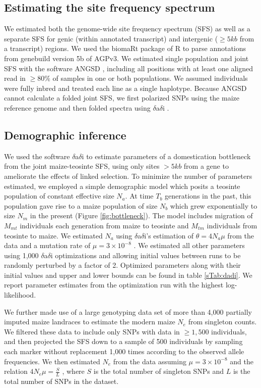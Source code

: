 \documentclass[12pt,a4paper]{article}
\begin{document}
\subsection*{Estimating the site frequency spectrum}
We estimated both the genome-wide site frequency spectrum (SFS) as well as a separate SFS for genic (within annotated transcript) and intergenic ($\geq 5kb$ from a transcript) regions. 
We used the biomaRt package \cite{durinck2009,durinck2005} of R \cite{R2014} to parse annotations from genebuild version 5b of AGPv3. 
We estimated single population and joint SFS with the software ANGSD \cite{korneliussen2014}, including all positions with at least one aligned read in $\geq 80\%$ of samples in one or both populations.
We assumed individuals were fully inbred and treated each line as a single haplotype. Because ANGSD cannot calculate a folded joint SFS, we first polarized SNPs using the maize reference genome and then folded spectra using $\delta$a$\delta$i \cite{gutenkunst2009}.

\subsection*{Demographic inference}
We used the software $\delta$a$\delta$i \cite{gutenkunst2009} to estimate parameters of a domestication bottleneck from the joint maize-teosinte SFS, using only sites $>5 kb$ from a gene to ameliorate the effects of linked selection.
To minimize the number of parameters estimated, we employed a simple demographic model which posits a teosinte population of constant effective size $N_a$.  At time $T_b$ generations in the past, this population gave rise to a maize population of size $N_b$ which grew exponentially to size $N_m$ in the present (Figure \ref{fig:bottleneck}).
The model includes migration of $M_{mt}$ individuals each generation from maize to teosinte and $M_{tm}$ individuals from teosinte to maize.  We estimated $N_a$ using $\delta$a$\delta$i's estimation of $\theta=4N_a\mu$ from the data and a mutation rate of $\mu = 3 \times 10^{-8}$ \cite{clark2005}. 
We estimated all other parameters using 1,000 $\delta$a$\delta$i optimizations and allowing initial values between runs to be randomly perturbed by a factor of 2.  
Optimized parameters along with their initial values and upper and lower bounds can be found in table \ref{sTab:dadi}. We report parameter estimates from the optimization run with the highest log-likelihood.

We further made use of a large genotyping data set of more than 4,000 partially imputed maize landraces \cite{Hearne2015} to estimate the modern maize $N_e$ from singleton counts. 
We filtered these data to include only SNPs with data in $\geq 1,500$ individuals, and then projected the SFS down to a sample of 500 individuals by sampling each marker without replacement 1,000 times according to the observed allele frequencies.
We then estimated $N_e$ from the data assuming $\mu = 3 \times 10^{-8}$ \cite{clark2005} and the relation  $4N_e\mu = \frac{S}{L}$ \cite{fu1993}, where $S$ is the total number of singleton SNPs and $L$ is the total number of SNPs in the dataset.
\end{document}
